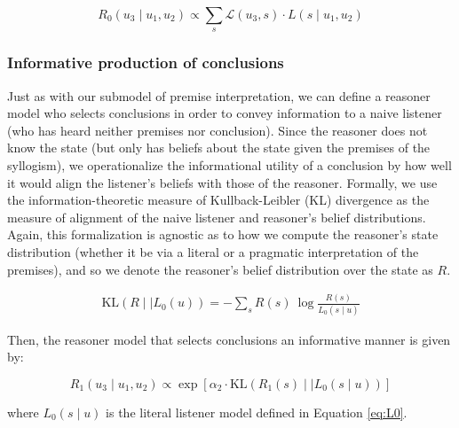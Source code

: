 \documentclass[floatsintext, doc]{apa6}
\begin{document}

\begin{equation}
R_0(u_3 \mid u_1, u_2) \propto \sum_s \mathcal{L}(u_3, s) \cdot L(s \mid u_1, u_2) \label{eq:R0}
\end{equation}

\subsubsection{Informative production of conclusions}

Just as with our submodel of premise interpretation, we can define a reasoner model who selects conclusions in order to convey information to a naive listener (who has heard neither premises nor conclusion). 
Since the reasoner does not know the state (but only has beliefs about the state given the premises of the syllogism), we operationalize the informational utility of a conclusion by how well it would align the listener's beliefs with those of the reasoner. 
Formally, we use the information-theoretic measure of Kullback-Leibler (KL) divergence as the measure of alignment of the naive listener and reasoner's belief distributions. 
Again, this formalization is agnostic as to how we compute the reasoner's state distribution (whether it be via a literal or a pragmatic interpretation of the premises), and so we denote the reasoner's belief distribution over the state as $R$.

\begin{align}
  \label{eq:KL-divergence}
  \text{KL}({R \mid \mid L_0}(u)) = - \sum_{s} R(s) \ \log \frac{R(s)}{{L_{0}}(s \mid u)}
\end{align}

\noindent Then, the reasoner model that selects conclusions an informative manner is given by: 

\begin{equation}
R_1(u_3 \mid u_1,  u_2) \propto  \exp [ \alpha_2 \cdot \text{KL}({R_1(s) \mid \mid L_0}(s \mid u)) ]  \label{eq:R1}
\end{equation}

\noindent where $L_0(s \mid u)$ is the literal listener model defined in Equation \ref{eq:L0}. 
\end{document}
